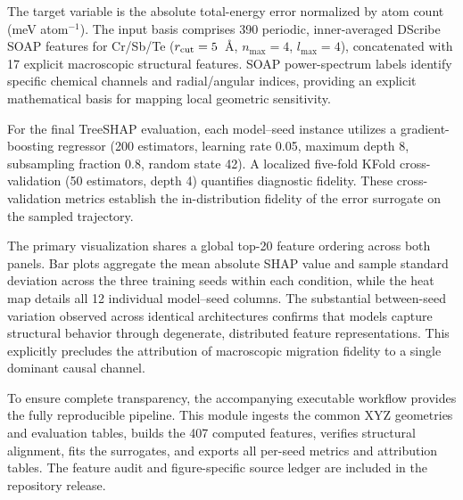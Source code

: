 \documentclass[pdflatex,sn-mathphys-num]{sn-jnl}
\begin{document}
The target variable is the absolute total-energy error normalized by atom count (meV atom$^{-1}$). The input basis comprises 390 periodic, inner-averaged DScribe SOAP features for Cr/Sb/Te ($r_{\rm cut}=5$~\AA, $n_{\max}=4$, $l_{\max}=4$), concatenated with 17 explicit macroscopic structural features. SOAP power-spectrum labels identify specific chemical channels and radial/angular indices, providing an explicit mathematical basis for mapping local geometric sensitivity.

For the final TreeSHAP evaluation, each model--seed instance utilizes a gradient-boosting regressor (200 estimators, learning rate 0.05, maximum depth 8, subsampling fraction 0.8, random state 42). A localized five-fold KFold cross-validation (50 estimators, depth 4) quantifies diagnostic fidelity. These cross-validation metrics establish the in-distribution fidelity of the error surrogate on the sampled trajectory. 

\begin{table}[htbp]
\centering\small
\caption{\textbf{Error-surrogate fidelity diagnostic.} Values represent the mean $\pm$ sample standard deviation across the three underlying training seeds. Each entry summarizes the distinct five-fold diagnostic estimator on the identical 267-frame sample. The MAE is normalized to meV atom$^{-1}$. These metrics explicitly quantify in-distribution surrogate fit fidelity.}
\label{tab:current_shap_fidelity}

\end{table}

The primary visualization shares a global top-20 feature ordering across both panels. Bar plots aggregate the mean absolute SHAP value and sample standard deviation across the three training seeds within each condition, while the heat map details all 12 individual model--seed columns. The substantial between-seed variation observed across identical architectures confirms that models capture structural behavior through degenerate, distributed feature representations. This explicitly precludes the attribution of macroscopic migration fidelity to a single dominant causal channel.

To ensure complete transparency, the accompanying executable workflow provides the fully reproducible pipeline. This module ingests the common XYZ geometries and evaluation tables, builds the 407 computed features, verifies structural alignment, fits the surrogates, and exports all per-seed metrics and attribution tables. The feature audit and figure-specific source ledger are included in the repository release.


% 

\end{document}
